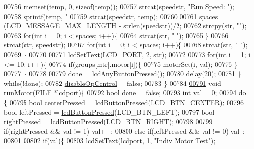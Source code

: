 \begin{DoxyCode}
{{{{{{{{{{{00756         memset(temp, 0, \textcolor{keyword}{sizeof}(temp));
00757         strcat(speedstr, \textcolor{stringliteral}{"Run Speed: "});
00758         sprintf(temp, \textcolor{stringliteral}{"%
00759         strcat(speedstr, temp);
00760 
00761         spaces = (\hyperlink{lcdmsg_8h_abe4c4b70fc6f44ae3680e5b2c68cdd00}{LCD\_MESSAGE\_MAX\_LENGTH} - strlen(speedstr))/2;
00762         strcpy(str, \textcolor{stringliteral}{""});
00763         \textcolor{keywordflow}{for}(\textcolor{keywordtype}{int} i = 0; i < spaces; i++)\{
00764             strcat(str, \textcolor{stringliteral}{" "});
00765         \}
00766         strcat(str, speedstr);
00767         \textcolor{keywordflow}{for}(\textcolor{keywordtype}{int} i = 0; i < spaces; i++)\{
00768             strcat(str, \textcolor{stringliteral}{" "});
00769         \}
00770 
00771         lcdSetText(\hyperlink{lcdmsg_8h_abcf42bd88b3c36193f301ca25b033875}{LCD\_PORT}, 2, str);
00772 
00773         \textcolor{keywordflow}{for}(\textcolor{keywordtype}{int} i = 1; i <= 10; i++)\{
00774             \textcolor{keywordflow}{if}(groups[mtr].motor[i])\{
00775                 motorSet(i, val);
00776             \}
00777         \}
00778 
00779         done = \hyperlink{lcddiag_8h_a0592813f995bfeeadb9bee923833ed35}{lcdAnyButtonPressed}();
00780         delay(20);
00781     \} \textcolor{keywordflow}{while}(!done);
00782     \hyperlink{lcddiag_8c_a0f0b335cd078d025d6fb720eb3bf6437}{disableOpControl} = \textcolor{keyword}{false};
00783 \}
00784 
\hypertarget{lcddiag_8c_source.tex_l00791}{}\hyperlink{lcddiag_8c_a3391c1825bcf4987f3fad9f42a9c1f0d}{00791} \textcolor{keywordtype}{void} \hyperlink{lcddiag_8c_a3391c1825bcf4987f3fad9f42a9c1f0d}{runMotor}(FILE *lcdport)\{
00792     \textcolor{keywordtype}{bool} done = \textcolor{keyword}{false};
00793     \textcolor{keywordtype}{int} val = 0;
00794     \textcolor{keywordflow}{do} \{
00795         \textcolor{keywordtype}{bool} centerPressed = \hyperlink{lcddiag_8h_a74e4c744db49f9b7b645095575e152ad}{lcdButtonPressed}(LCD\_BTN\_CENTER);
00796         \textcolor{keywordtype}{bool} leftPressed = \hyperlink{lcddiag_8h_a74e4c744db49f9b7b645095575e152ad}{lcdButtonPressed}(LCD\_BTN\_LEFT);
00797         \textcolor{keywordtype}{bool} rightPressed = \hyperlink{lcddiag_8h_a74e4c744db49f9b7b645095575e152ad}{lcdButtonPressed}(LCD\_BTN\_RIGHT);
00798 
00799         \textcolor{keywordflow}{if}(rightPressed && val != 1) val++;
00800         \textcolor{keywordflow}{else} \textcolor{keywordflow}{if}(leftPressed && val != 0) val--;
00801 
00802         \textcolor{keywordflow}{if}(val)\{
00803             lcdSetText(lcdport, 1, \textcolor{stringliteral}{"Indiv Motor Test"});
}}}}}}}}}}}}
\end{DoxyCode}
